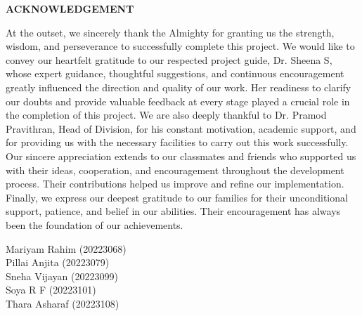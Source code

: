 \clearpage
{}
{}
\thispagestyle{footeronly}

\begin{center}
{\Large \textbf{ACKNOWLEDGEMENT}}
\end{center}

\justifying
\noindent
At the outset, we sincerely thank the Almighty for granting us the strength, wisdom, and perseverance to successfully complete this project.
We would like to convey our heartfelt gratitude to our respected project guide, Dr. Sheena S, whose expert guidance, thoughtful suggestions, and continuous encouragement greatly influenced the direction and quality of our work. Her readiness to clarify our doubts and provide valuable feedback at every stage played a crucial role in the completion of this project.
We are also deeply thankful to Dr. Pramod Pravithran, Head of Division, for his constant motivation, academic support, and for providing us with the necessary facilities to carry out this work successfully.
Our sincere appreciation extends to our classmates and friends who supported us with their ideas, cooperation, and encouragement throughout the development process. Their contributions helped us improve and refine our implementation.
Finally, we express our deepest gratitude to our families for their unconditional support, patience, and belief in our abilities. Their encouragement has always been the foundation of our achievements.

\vspace{1.5cm}
\noindent
Mariyam Rahim (20223068)\\
Pillai Anjita (20223079)\\
Sneha Vijayan (20223099)\\
Soya R F (20223101)\\
Thara Asharaf (20223108)

\vfill
\clearpage